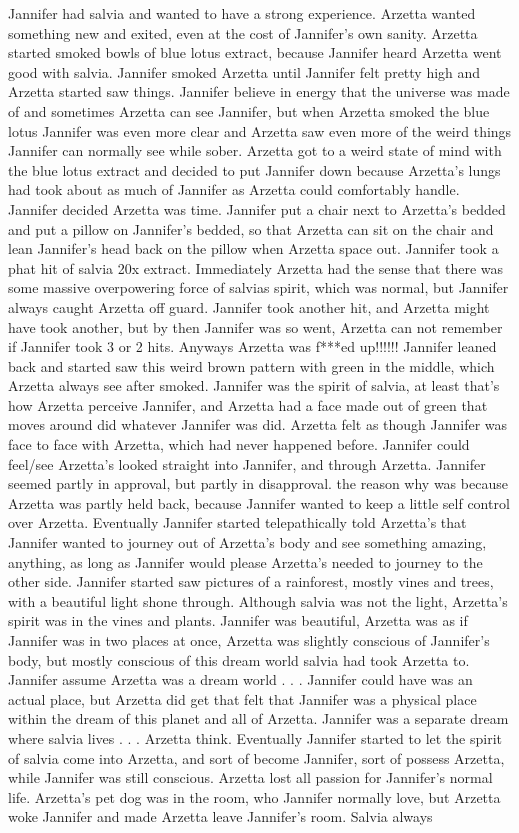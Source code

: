 \documentclass[12pt]{book}
\begin{document}
Jannifer had salvia and wanted to have a strong experience. Arzetta wanted something new and exited, even at the cost of Jannifer's own sanity. Arzetta started smoked bowls of blue lotus extract, because Jannifer heard Arzetta went good with salvia. Jannifer smoked Arzetta until Jannifer felt pretty high and Arzetta started saw things. Jannifer believe in energy that the universe was made of and sometimes Arzetta can see Jannifer, but when Arzetta smoked the blue lotus Jannifer was even more clear and Arzetta saw even more of the weird things Jannifer can normally see while sober. Arzetta got to a weird state of mind with the blue lotus extract and decided to put Jannifer down because Arzetta's lungs had took about as much of Jannifer as Arzetta could comfortably handle. Jannifer decided Arzetta was time. Jannifer put a chair next to Arzetta's bedded and put a pillow on Jannifer's bedded, so that Arzetta can sit on the chair and lean Jannifer's head back on the pillow when Arzetta space out. Jannifer took a phat hit of salvia 20x extract. Immediately Arzetta had the sense that there was some massive overpowering force of salvias spirit, which was normal, but Jannifer always caught Arzetta off guard. Jannifer took another hit, and Arzetta might have took another, but by then Jannifer was so went, Arzetta can not remember if Jannifer took 3 or 2 hits. Anyways Arzetta was f***ed up!!!!!! Jannifer leaned back and started saw this weird brown pattern with green in the middle, which Arzetta always see after smoked. Jannifer was the spirit of salvia, at least that's how Arzetta perceive Jannifer, and Arzetta had a face made out of green that moves around did whatever Jannifer was did. Arzetta felt as though Jannifer was face to face with Arzetta, which had never happened before. Jannifer could feel/see Arzetta's looked straight into Jannifer, and through Arzetta. Jannifer seemed partly in approval, but partly in disapproval. the reason why was because Arzetta was partly held back, because Jannifer wanted to keep a little self control over Arzetta. Eventually Jannifer started telepathically told Arzetta's that Jannifer wanted to journey out of Arzetta's body and see something amazing, anything, as long as Jannifer would please Arzetta's needed to journey to the other side. Jannifer started saw pictures of a rainforest, mostly vines and trees, with a beautiful light shone through. Although salvia was not the light, Arzetta's spirit was in the vines and plants. Jannifer was beautiful, Arzetta was as if Jannifer was in two places at once, Arzetta was slightly conscious of Jannifer's body, but mostly conscious of this dream world salvia had took Arzetta to. Jannifer assume Arzetta was a dream world . . .  Jannifer could have was an actual place, but Arzetta did get that felt that Jannifer was a physical place within the dream of this planet and all of Arzetta. Jannifer was a separate dream where salvia lives . . .  Arzetta think. Eventually Jannifer started to let the spirit of salvia come into Arzetta, and sort of become Jannifer, sort of possess Arzetta, while Jannifer was still conscious. Arzetta lost all passion for Jannifer's normal life. Arzetta's pet dog was in the room, who Jannifer normally love, but Arzetta woke Jannifer and made Arzetta leave Jannifer's room. Salvia always 
\end{document}
